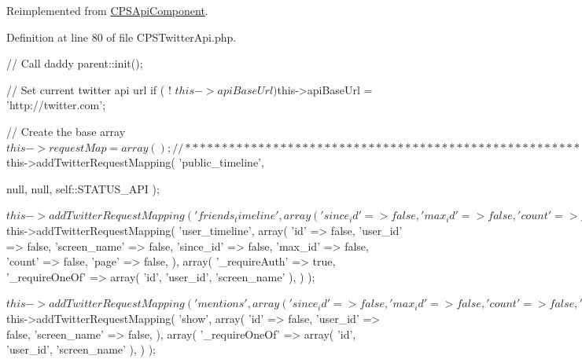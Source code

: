 Reimplemented from \hyperlink{classCPSApiComponent_a4be4055f3361d4800e16bc2e2e38cda6}{CPSApiComponent}.



Definition at line 80 of file CPSTwitterApi.php.




\begin{DoxyCode}
    {
        //  Call daddy
        parent::init();

        //  Set current twitter api url
        if ( ! $this->apiBaseUrl )
            $this->apiBaseUrl = 'http://twitter.com';
        
        //  Create the base array
        $this->requestMap = array();

        //***********************************************************************
      *********
        //* Statuses API
        //***********************************************************************
      *********
        
        $this->addTwitterRequestMapping( 'public_timeline',                      
                                      
            null,
            null,
            self::STATUS_API
        );

        $this->addTwitterRequestMapping( 'friends_timeline',
            array(
                'since_id' => false,
                'max_id' => false,
                'count' => false,
                'page' => false,
            ),
            array( '_requireAuth' => true )
        );

        $this->addTwitterRequestMapping( 'user_timeline',
            array(
                'id' => false,
                'user_id' => false,
                'screen_name' => false,
                'since_id' => false,
                'max_id' => false,
                'count' => false,
                'page' => false,
            ),
            array( 
                '_requireAuth' => true,
                '_requireOneOf' => array( 'id', 'user_id', 'screen_name' ),
            )
        );

        $this->addTwitterRequestMapping( 'mentions',
            array(
                'since_id' => false,
                'max_id' => false,
                'count' => false,
                'page' => false,
            ),
            array( '_requireAuth' => true )
        );

        $this->addTwitterRequestMapping( 'show',
            array(
                'id' => false,
                'user_id' => false,
                'screen_name' => false,
            ),
            array( 
                '_requireOneOf' => array( 'id', 'user_id', 'screen_name' ),
            )
        );

}
\end{DoxyCode}
